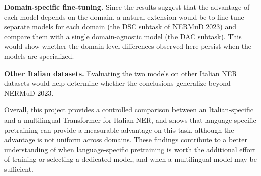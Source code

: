 \textbf{Domain-specific fine-tuning.} Since the results suggest that the advantage of each model depends on the domain, a natural extension would be to fine-tune separate models for each domain (the DSC subtask of NERMuD 2023) and compare them with a single domain-agnostic model (the DAC subtask). This would show whether the domain-level differences observed here persist when the models are specialized.

\textbf{Other Italian datasets.} Evaluating the two models on other Italian NER datasets would help determine whether the conclusions generalize beyond NERMuD 2023.

Overall, this project provides a controlled comparison between an Italian-specific and a multilingual Transformer for Italian NER, and shows that language-specific pretraining can provide a measurable advantage on this task, although the advantage is not uniform across domains. These findings contribute to a better understanding of when language-specific pretraining is worth the additional effort of training or selecting a dedicated model, and when a multilingual model may be sufficient.